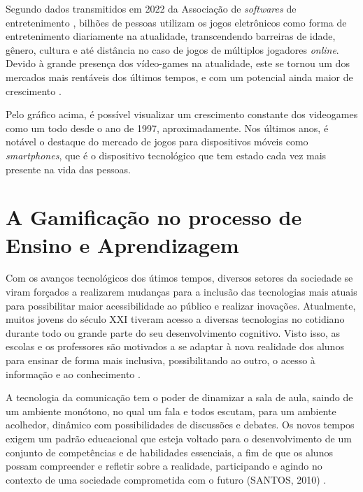 Segundo dados transmitidos em 2022 da Associação de \textit{softwares} de entretenimento \cite{esa_report_2022}, bilhões de pessoas utilizam os jogos eletrônicos como forma de entretenimento diariamente na atualidade, transcendendo barreiras de idade, gênero, cultura e até distância no caso de jogos de múltiplos jogadores \textit{online}. Devido à grande presença dos vídeo-games na atualidade, este se tornou um dos mercados mais rentáveis dos últimos tempos, e com um potencial ainda maior de crescimento \cite{video-game-economics}.


Pelo gráfico acima, é possível visualizar um crescimento constante dos videogames como um todo desde o ano de 1997, aproximadamente. Nos últimos anos, é notável o destaque do mercado de jogos para dispositivos móveis como \textit{smartphones}, que é o dispositivo tecnológico que tem estado cada vez mais presente na vida das pessoas.

\section{A Gamificação no processo de Ensino e Aprendizagem}

Com os avanços tecnológicos dos útimos tempos, diversos setores da sociedade se viram forçados a realizarem mudanças para a inclusão das tecnologias mais atuais para possibilitar maior acessibilidade ao público e realizar inovações. Atualmente, muitos jovens do século XXI tiveram acesso a diversas tecnologias no cotidiano durante todo ou grande parte do seu desenvolvimento cognitivo. Visto isso, as escolas e os professores são motivados a se adaptar à nova realidade dos alunos para ensinar de forma mais inclusiva, possibilitando ao outro, o acesso à informação e ao conhecimento \cite{tecnologia-professores}.

A tecnologia da comunicação tem o poder de dinamizar a sala de aula, saindo de um ambiente monótono, no qual um fala e todos escutam, para um ambiente acolhedor, dinâmico com possibilidades de discussões e debates. Os novos tempos exigem um padrão educacional que esteja voltado para o desenvolvimento de um conjunto de competências e de habilidades essenciais, a fim de que os alunos possam compreender e refletir sobre a realidade, participando e agindo no contexto de uma sociedade comprometida com o futuro (SANTOS, 2010) \cite{tecnologia-professores}.

